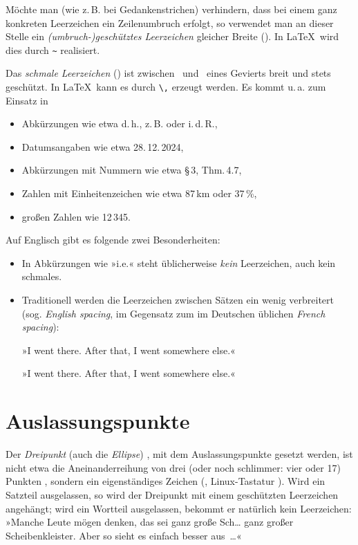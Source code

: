 Möchte man (wie z.\,B. bei Gedankenstrichen) verhindern, dass bei einem
ganz konkreten Leerzeichen ein Zeilenumbruch erfolgt, so verwendet man an dieser
Stelle ein \emph{(umbruch-)geschütztes Leerzeichen} gleicher Breite
(). In \LaTeX\ wird dies durch \verb!~! realisiert.

Das \emph{schmale Leerzeichen} () ist zwischen \ und
\ eines Gevierts breit und stets geschützt. In \LaTeX\ kann
es durch \verb!\,! erzeugt werden. Es kommt u.\,a. zum Einsatz in
\begin{itemize}
\item Abkürzungen wie etwa d.\,h., z.\,B. oder i.\,d.\,R.,
\item Datumsangaben wie etwa 28.\,12.\,2024,
\item Abkürzungen mit Nummern wie etwa §\,3, Thm.\,4.7,
\item Zahlen mit Einheitenzeichen wie etwa 87\,km oder 37\,\%,
\item großen Zahlen wie 12\,345.
\end{itemize}

Auf Englisch gibt es folgende zwei Besonderheiten:
\begin{itemize}
\item In Abkürzungen wie »\foreignlanguage{british}{i.e.}« steht
  üblicherweise \emph{kein} Leerzeichen, auch kein schmales.
\item Traditionell werden die Leerzeichen zwischen Sätzen ein wenig
  verbreitert (sog. \emph{\foreignlanguage{british}{English spacing}},
  im Gegensatz zum im Deutschen üblichen
  \emph{\foreignlanguage{british}{French spacing}}):

  »\foreignlanguage{british}{I went there.  After that, I went
    somewhere else.}«

  »\foreignlanguage{british}{\frenchspacing I went there.  After that,
    I went somewhere else.}«
\end{itemize}


\section{Auslassungspunkte}

Der \emph{Dreipunkt} (auch die \emph{Ellipse}) , mit dem
Auslassungspunkte gesetzt werden, ist nicht etwa die Aneinanderreihung
von drei (oder noch schlimmer: vier oder 17) Punkten ,
sondern ein eigenständiges Zeichen (, Linux-Tastatur
).  Wird ein Satzteil ausgelassen, so wird der
Dreipunkt mit einem geschützten Leerzeichen angehängt; wird ein
Wortteil ausgelassen, bekommt er natürlich kein Leerzeichen: »Manche
Leute mögen denken, das sei ganz große Sch… ganz großer
Scheibenkleister.  Aber so sieht es einfach besser aus~…«


